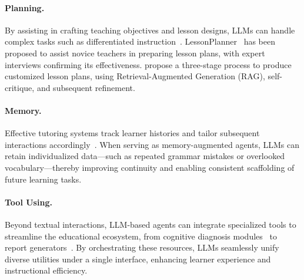 

\paragraph{Planning.} By assisting in crafting teaching objectives and lesson designs, LLMs can handle complex tasks such as differentiated instruction~\cite{hu2024teaching}. LessonPlanner~\cite{fan2024lessonplanner} has been proposed to assist novice teachers in preparing lesson plans, with expert interviews confirming its effectiveness. \citet{zheng2024automatic} propose a three-stage process to produce customized lesson plans, using Retrieval-Augmented Generation (RAG), self-critique, and subsequent refinement.

\paragraph{Memory.} Effective tutoring systems track learner histories and tailor subsequent interactions accordingly~\cite{jiang2024ai,chen2024empowering}. When serving as memory-augmented agents, LLMs can retain individualized data—such as repeated grammar mistakes or overlooked vocabulary—thereby improving continuity and enabling consistent scaffolding of future learning tasks.

\paragraph{Tool Using.} Beyond textual interactions, LLM-based agents can integrate specialized tools to streamline the educational ecosystem, from cognitive diagnosis modules~\cite{ma2019cognitive} to report generators~\cite{zhou2025study}. By orchestrating these resources, LLMs seamlessly unify diverse utilities under a single interface, enhancing learner experience and instructional efficiency.

